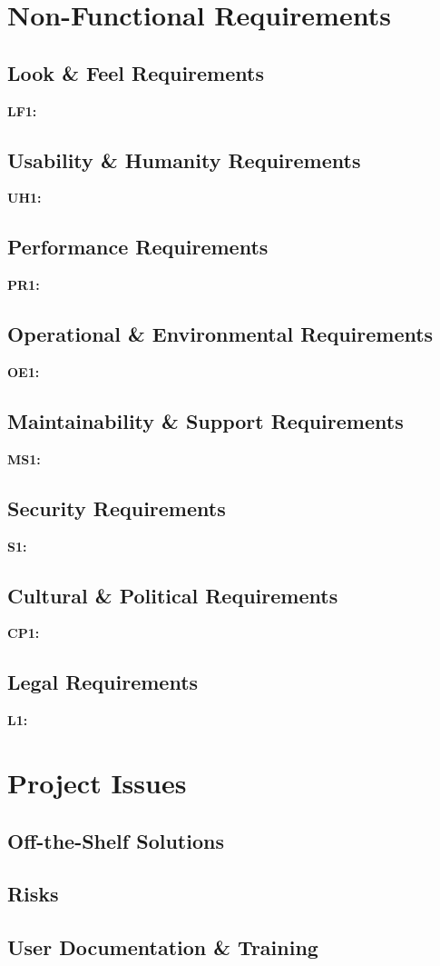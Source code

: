 \documentclass[titlepage]{article}
\begin{document}
\section{Non-Functional Requirements}
\subsection{Look \& Feel Requirements}
\textbf{LF1:} %

\subsection{Usability \& Humanity Requirements}
\textbf{UH1:} %

\subsection{Performance Requirements}
\textbf{PR1:} %

\subsection{Operational \& Environmental Requirements}
\textbf{OE1:} %

\subsection{Maintainability \& Support Requirements}
\textbf{MS1:} %

\subsection{Security Requirements}
\textbf{S1:} %

\subsection{Cultural \& Political Requirements}
\textbf{CP1:} %

\subsection{Legal Requirements}
\textbf{L1:} %


\section{Project Issues}
\subsection{Off-the-Shelf Solutions}

\subsection{Risks}

\subsection{User Documentation \& Training}


\pagebreak
\printindex
\end{document}
